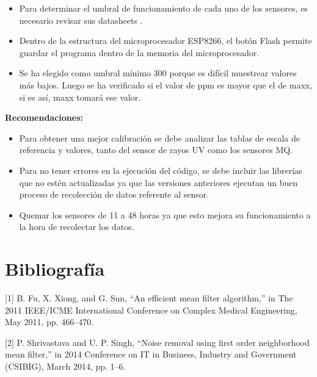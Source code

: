 \documentclass[10pt,a4paper]{article}
\begin{document}
\begin{multicols}{2}
\begin{itemize}
\begin{itemize}
\item Para determinar el umbral de funcionamiento de cada uno de los sensores, es necesario revisar sus datasheets .\\
 
\item Dentro de la estructura del microprocesador ESP8266, el botón Flash permite guardar el programa dentro de la memoria del microprocesador.\\

\item Se ha  elegido como umbral mínimo 300 porque es difícil muestrear valores más bajos. Luego  se ha verificado si el valor de ppm es mayor que el de maxx, si es así, maxx  tomará ese valor.\\


 
\end{itemize}

\textbf{Recomendaciones:}
\begin{itemize}
\renewcommand{\labelitemi}{$*$}

\item Para obtener una mejor calibración se debe analizar las tablas de escala de referencia y valores, tanto del sensor de rayos UV como los sensores MQ.
 
\item Para no tener errores en la ejecución del código, se debe incluir las librerías que no estén actualizadas ya que las versiones anteriores ejecutan un buen proceso de recolección de datos referente al sensor.\\

\item Quemar los sensores de 11 a 48 horas ya que esto mejora su funcionamiento a la hora de recolectar los datos.\\



 
\end{itemize}

\section{Bibliografía}

[1] B. Fu, X. Xiong, and G. Sun, “An efficient mean filter algorithm,” in The 2011 IEEE/ICME International Conference on Complex Medical Engineering, May 2011, pp. 466–470.

[2] P. Shrivastava and U. P. Singh, “Noise removal using first order neighborhood mean filter,” in 2014 Conference on IT in Business, Industry and Government (CSIBIG), March 2014, pp. 1–6.


\end{itemize}
\end{multicols}
\end{document}
